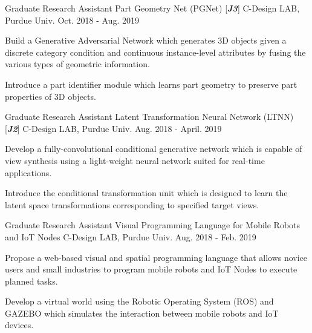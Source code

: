 \begin{cventries}

\cventry
{Graduate Research Assistant} %
{Part Geometry Net (PGNet) [\textit{\textbf{J3}}]} %
{C-Design LAB, Purdue Univ.} %
{Oct. 2018 - Aug. 2019} %
{ %
\begin{cvitems}
\item {Build a Generative Adversarial Network which generates 3D objects given a discrete category condition and continuous instance-level attributes by fusing the various types of geometric information.}
\item {Introduce a part identifier module which learns part geometry to preserve part properties of 3D objects.}
\end{cvitems}
}


\cventry
{Graduate Research Assistant} %
{Latent Transformation Neural Network (LTNN) [\textit{\textbf{J2}}]} %
{C-Design LAB, Purdue Univ.} %
{Aug. 2018 - April. 2019} %
{ %
\begin{cvitems}
\item {Develop a fully-convolutional conditional generative network which is capable of view synthesis using a light-weight neural network suited for real-time applications.}
\item {Introduce the conditional transformation unit which is designed to learn the latent space transformations corresponding to specified target views.}
\end{cvitems}
}


\cventry
{Graduate Research Assistant} %
{Visual Programming Language for Mobile Robots and IoT Nodes} %
{C-Design LAB, Purdue Univ.} %
{Aug. 2018 - Feb. 2019} %
{ %
\begin{cvitems}
\item {Propose a web-based visual and spatial programming language that allows novice users and small industries to program mobile robots and IoT Nodes to execute planned tasks.}
\item {Develop a virtual world using the Robotic Operating System (ROS) and GAZEBO which simulates the interaction between mobile robots and IoT devices.}
\end{cvitems} 
}


\end{cventries}
